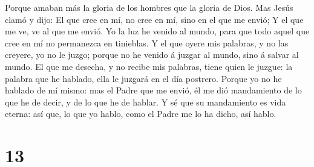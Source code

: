  Porque amaban más la gloria de los hombres que la gloria
de Dios.  Mas Jesús clamó y dijo: El que cree en mí, no
cree en mí, sino en el que me envió;  Y el que me ve, ve
al que me envió.  Yo la luz he venido al mundo, para que
todo aquel que cree en mí no permanezca en tinieblas.  Y
el que oyere mis palabras, y no las creyere, yo no le juzgo; porque no
he venido á juzgar al mundo, sino á salvar al mundo.  El
que me desecha, y no recibe mis palabras, tiene quien le juzgue: la
palabra que he hablado, ella le juzgará en el día postrero.
 Porque yo no he hablado de mí mismo: mas el Padre que me
envió, él me dió mandamiento de lo que he de decir, y de lo que he de
hablar.  Y sé que su mandamiento es vida eterna: así que,
lo que yo hablo, como el Padre me lo ha dicho, así hablo.

\hypertarget{section-12}{%
\section{13}\label{section-12}}


